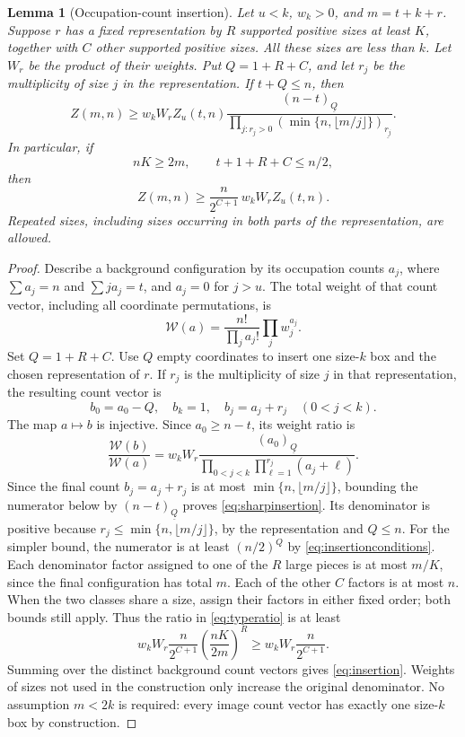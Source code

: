 \documentclass[11pt]{article}
\newtheorem{lemma}[theorem]{Lemma}
\theoremstyle{remark}\newtheorem{remark}[theorem]{Remark}
\newcommand{\fall}[2]{(#1)_{\underline{#2}}}
\begin{document}
\begin{lemma}[Occupation-count insertion]\label{lem:insertion}
Let $u<k$, $w_k>0$, and $m=t+k+r$. Suppose $r$ has a fixed representation
by $R$ supported positive sizes at least $K$, together with $C$ other
supported positive sizes. All these sizes are less than $k$. Let $W_r$ be
the product of their weights. Put $Q=1+R+C$, and let $r_j$ be the
multiplicity of size $j$ in the representation. If $t+Q\le n$, then
\begin{equation}\label{eq:sharpinsertion}
 Z(m,n)\ge w_kW_r Z_u(t,n)
 \frac{\fall{n-t}{Q}}
 {\displaystyle\prod_{j:r_j>0}\fall{\min\{n,\lfloor m/j\rfloor\}}{r_j}}.
\end{equation}
In particular, if
\begin{equation}\label{eq:insertionconditions}
 nK\ge2m,\qquad t+1+R+C\le n/2,
\end{equation}
then
\begin{equation}\label{eq:insertion}
 Z(m,n)\ge\frac{n}{2^{C+1}}\,w_k W_r Z_u(t,n).
\end{equation}
Repeated sizes, including sizes occurring in both parts of the
representation, are allowed.
\end{lemma}

\begin{proof}
Describe a background configuration by its occupation counts $a_j$, where
$\sum a_j=n$ and $\sum j a_j=t$, and $a_j=0$ for $j>u$. The total weight of
that count vector, including all coordinate permutations, is
\[
 \mathcal W(a)=\frac{n!}{\prod_j a_j!}\prod_j w_j^{a_j}.
\]
Set $Q=1+R+C$. Use $Q$ empty coordinates to insert one size-$k$ box and the
chosen representation of $r$. If $r_j$ is the multiplicity of size $j$ in
that representation, the resulting count vector is
\[
 b_0=a_0-Q,\quad b_k=1,\quad b_j=a_j+r_j\quad(0<j<k).
\]
The map $a\mapsto b$ is injective. Since $a_0\ge n-t$, its weight ratio is
\begin{equation}\label{eq:typeratio}
 \frac{\mathcal W(b)}{\mathcal W(a)}
 =w_kW_r\frac{\fall{a_0}{Q}}
 {\displaystyle\prod_{0<j<k}\prod_{\ell=1}^{r_j}(a_j+\ell)}.
\end{equation}
Since the final count $b_j=a_j+r_j$ is at most
$\min\{n,\lfloor m/j\rfloor\}$, bounding the numerator below by
$\fall{n-t}{Q}$ proves \eqref{eq:sharpinsertion}. Its denominator is
positive because $r_j\le\min\{n,\lfloor m/j\rfloor\}$, by the representation
and $Q\le n$. For the simpler bound, the numerator is at
least $(n/2)^Q$ by \eqref{eq:insertionconditions}.
Each denominator factor assigned to one of the $R$ large pieces is at most
$m/K$, since the final configuration has total $m$. Each of the other $C$
factors is at most $n$. When the two classes share a size, assign their
factors in either fixed order; both bounds still apply. Thus the ratio in
\eqref{eq:typeratio} is at least
\[
 w_kW_r\frac{n}{2^{C+1}}
       \left(\frac{nK}{2m}\right)^R
 \ge w_kW_r\frac{n}{2^{C+1}}.
\]
Summing over the distinct background count vectors gives
\eqref{eq:insertion}. Weights of sizes not used in the construction only
increase the original denominator. No assumption $m<2k$ is required:
every image count vector has exactly one size-$k$ box by construction.
\end{proof}
\end{document}

